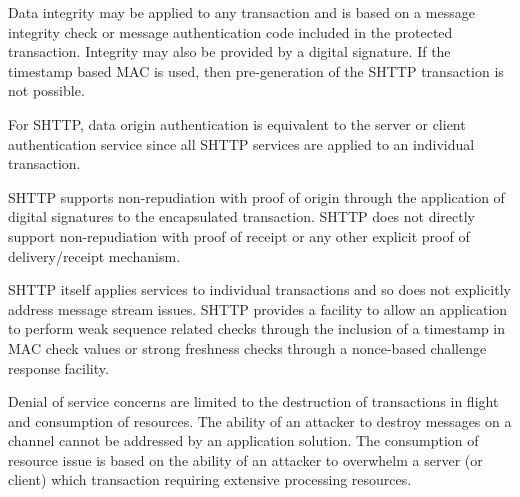   
  Data integrity may be applied to any transaction and is based on a
  message integrity check or message authentication code included in the
  protected transaction. Integrity may also be provided by a digital
  signature. If the timestamp based MAC is used, then pre-generation of the
  SHTTP transaction is not possible.

  
  For SHTTP, data origin authentication is equivalent to the server or
  client authentication service since all SHTTP services are applied to an
  individual transaction.

  
  SHTTP supports non-repudiation with proof of origin through the
  application of digital signatures to the encapsulated transaction.  SHTTP
  does not directly support non-repudiation with proof of receipt or any
  other explicit proof of delivery/receipt mechanism.

  
  SHTTP itself applies services to individual transactions and so does not
  explicitly address message stream issues. SHTTP provides a facility to
  allow an application to perform weak sequence related checks through the
  inclusion of a timestamp in MAC check values or strong freshness checks
  through a nonce-based challenge response facility.

  
  Denial of service concerns are limited to the destruction of transactions
  in flight and consumption of resources. The ability of an attacker to
  destroy messages on a channel cannot be addressed by an application
  solution. The consumption of resource issue is based on the ability of an
  attacker to overwhelm a server (or client) which transaction requiring
  extensive processing resources.
\latexhtml{\end{itemize}}{\end{htmllist}}


